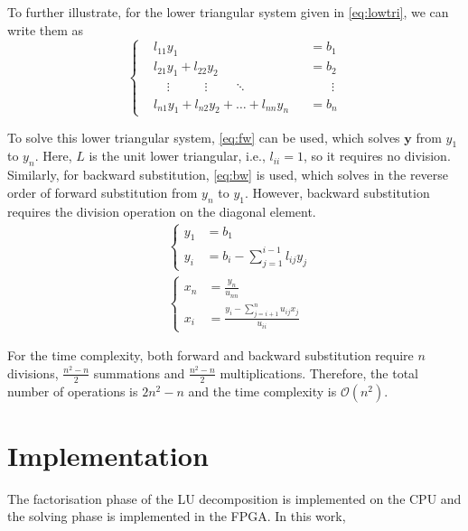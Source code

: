 \documentclass[11pt,a4paper]{article}
\begin{document}
To further illustrate, for the lower triangular system given in \autoref{eq:lowtri}, we can write them as
\begin{equation}
    \left\{\begin{alignedat}{2}
        & l_{11}y_1                                                         && =b_1               \\
        & l_{21}y_1+l_{22}y_2                                               && =b_2               \\
        & \phantom{l_{31}}\vdots\phantom{y+l_{32}}\vdots\phantom{y+l}\ddots && \phantom{=b}\vdots \\
        & l_{n1}y_1+l_{n2}y_2+\dots+l_{nn}y_n                               && =b_n
    \end{alignedat}\right.
\end{equation}

To solve this lower triangular system, \autoref{eq:fw} can be used, which solves \(\bm{y}\) from \(y_1\) to \(y_n\). Here, \(L\) is the unit lower triangular, i.e., \(l_{ii}=1\), so it requires no division. Similarly, for backward substitution, \autoref{eq:bw} is used, which solves in the reverse order of forward substitution from \(y_n\) to \(y_1\).  However, backward substitution requires the division operation on the diagonal element.
\begin{align}
     & \left\{\begin{aligned}
                  y_1 & =b_1                           \\
                  y_i & =b_i-\sum_{j=1}^{i-1}l_{ij}y_j
              \end{aligned}\right.
    \label{eq:fw}                                                                          \\
     & \left\{\begin{aligned}
                  x_n & =\frac{y_n}{u_{nn}}                           \\
                  x_i & =\frac{y_i-\sum_{j=i+1}^{n}u_{ij}x_j}{u_{ii}}
              \end{aligned}\right.
    \label{eq:bw}
\end{align}

For the time complexity, both forward and backward substitution require \(n\) divisions, \(\frac{n^2-n}{2}\) summations and \(\frac{n^2-n}{2}\) multiplications. Therefore, the total number of operations is \(2n^2-n\) and the time complexity is \(\mathcal{O}(n^2)\).

\section{Implementation}
The factorisation phase of the LU decomposition is implemented on the CPU and the solving phase is implemented in the FPGA. In this work,
\end{document}
